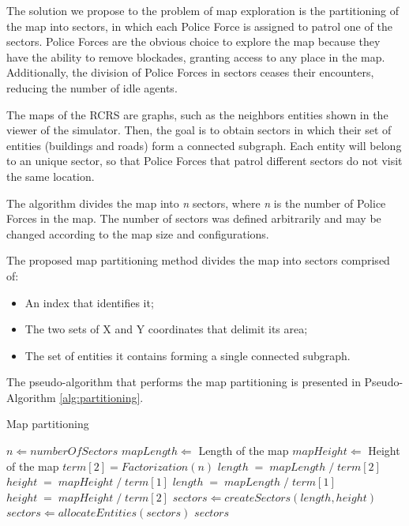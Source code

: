 The solution we propose to the problem of map exploration is the partitioning of the map into sectors, in which each Police Force is assigned to patrol one of the sectors. Police Forces are the obvious choice to explore the map because they have the ability to remove blockades, granting access to any place in the map. Additionally, the division of Police Forces in sectors ceases their encounters, reducing the number of idle agents.

The maps of the RCRS are graphs, such as the neighbors entities shown in the viewer of the simulator. Then, the goal is to obtain sectors in which their set of entities (buildings and roads) form a connected subgraph. Each entity will belong to an unique sector, so that Police Forces that patrol different sectors do not visit the same location.

The algorithm divides the map into {\it n} sectors, where {\it n} is the number of Police Forces in the map. The number of sectors was defined arbitrarily and may be changed according to the map size and configurations.

The proposed map partitioning method divides the map into sectors comprised of:
\begin{itemize}
\item An index that identifies it;
\item The two sets of X and Y coordinates that delimit its area;
\item The set of entities it contains forming a single connected subgraph.
\end{itemize}

The pseudo-algorithm that performs the map partitioning is presented in Pseudo-Algorithm \ref{alg:partitioning}.
\begin{algorithm}
  \caption{Map partitioning}
  \label{alg:partitioning}
  \begin{algorithmic}
    \REQUIRE $n \Leftarrow numberOfSectors$
    \STATE
    \STATE $mapLength \Leftarrow$ Length of the map
    \STATE $mapHeight \Leftarrow$ Height of the map
    \STATE $term[2] = Factorization(n)$ 
      \STATE $length\;=\;mapLength\;/\;term[2]$
      \STATE $height\;=\;mapHeight\;/\;term[1]$
    \ELSE
      \STATE $length\;=\;mapLength\;/\;term[1]$
      \STATE $height\;=\;mapHeight\;/\;term[2]$
    \ENDIF
    \STATE $sectors \Leftarrow createSectors(length, height)$
    \STATE $sectors \Leftarrow allocateEntities(sectors)$
    \RETURN $sectors$
  \end{algorithmic}
\end{algorithm}

